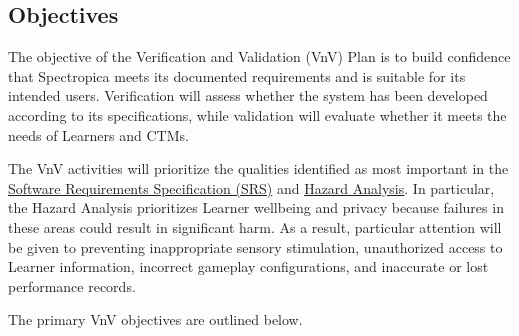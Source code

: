 \documentclass[12pt, titlepage]{article}
\newcounter{validation}
\begin{document}
\subsection{Objectives}

The objective of the Verification and Validation (VnV) Plan is to build confidence that Spectropica meets its documented requirements and is suitable for its intended users. Verification will assess whether the system has been developed according to its specifications, while validation will evaluate whether it meets the needs of Learners and CTMs.

The VnV activities will prioritize the qualities identified as most important in the {\href{https://github.com/meena-alomran/game-n-grow/blob/main/pdfs/SRS-IEEE/SRS.pdf}{Software
Requirements Specification (SRS)}} and {\href{https://github.com/meena-alomran/game-n-grow/blob/main/pdfs/HazardAnalysis/HazardAnalysis.pdf}{Hazard Analysis}}. In particular, the Hazard Analysis prioritizes Learner wellbeing and privacy because failures in these areas could result in significant harm. As a result, particular attention will be given to preventing inappropriate sensory stimulation, unauthorized access to Learner information, incorrect gameplay configurations, and inaccurate or lost performance records.

The primary VnV objectives are outlined below.
\end{document}
